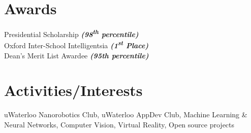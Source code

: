 ﻿\documentclass[letterpaper]{deedy-resume} %
\begin{document}
\begin{minipage}[t]{0.33\textwidth}
        \section{Awards} 
        Presidential Scholarship {\footnotesize \textit{\textbf{(98\textsuperscript{th} percentile)}}}\\
        Oxford Inter-School Intelligentsia 
        {\footnotesize \textit{\textbf{(1\textsuperscript{st} Place)}}}\\
        Dean's Merit List Awardee 
        {\footnotesize \textit{\textbf{(95th percentile)}}}\\

        \section{Activities/Interests} 
        uWaterloo Nanorobotics Club, uWaterloo AppDev Club, Machine Learning \& Neural Networks, Computer Vision, Virtual Reality, Open source projects


\end{minipage} %
\hfill
%
%
\end{document}
